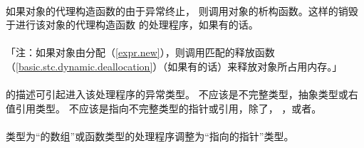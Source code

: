 \paragraph{}
如果对象的代理构造函数的由于异常终止，
则调用对象的析构函数。这样的销毁于进行该对象的代理构造函数
的处理程序，如果有的话。

\paragraph{}
「注：如果对象由分配（\ref{expr.new}），则调用匹配的释放函数
（\ref{basic.stc.dynamic.deallocation}）（如果有的话）来释放对象所占用内存。」

\paragraph{}
的描述可引起进入该处理程序的异常类型。
不应该是不完整类型，抽象类型或右值引用类型。
不应该是指向不完整类型的指针或引用，除了，
，或者。

\paragraph{}
类型为``的数组''或函数类型的处理程序调整为``指向的指针''类型。

